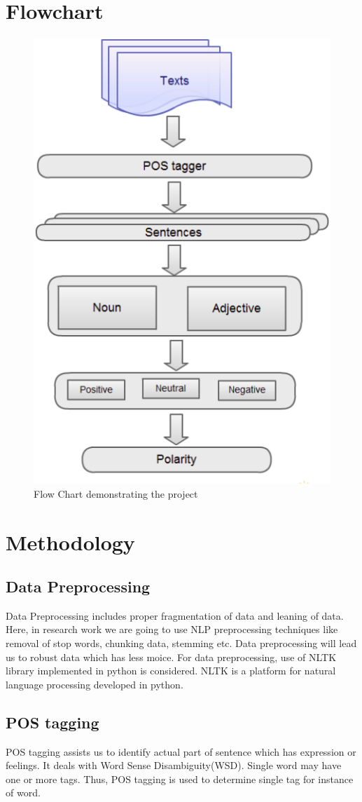 \section{Flowchart }
\begin{figure}[h]
	\centering
	\includegraphics[width=0.7\linewidth]{flow}
	\caption{Flow Chart demonstrating the project}
\end{figure}

\section{Methodology}

\subsection{Data Preprocessing }
Data Preprocessing includes proper fragmentation of data and leaning of data. Here, in research work we are going to use NLP preprocessing techniques like removal of stop words, chunking data, stemming etc. Data preprocessing will lead us to robust data which has less moice. For data preprocessing, use of NLTK library implemented in python is considered. NLTK is a platform for natural language processing developed in python.

\subsection{POS tagging}
POS tagging assists us to identify actual part of sentence which has expression or feelings. It deals with Word Sense Disambiguity(WSD). Single word may have one or more tags. Thus, POS tagging is used to determine single tag for instance of word.
